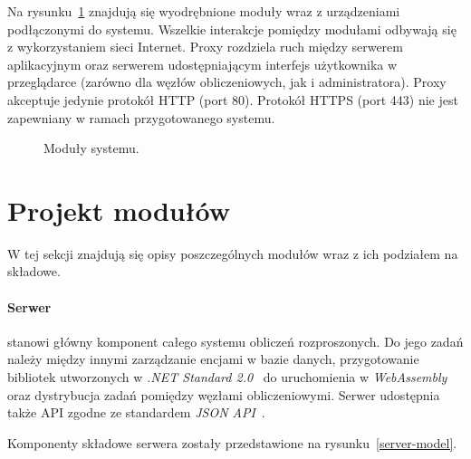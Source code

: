 \documentclass[a4paper,11pt,twoside]{report}
\theoremstyle{definition}
\begin{document}
Na rysunku~\ref{project-model} znajdują się wyodrębnione moduły wraz z urządzeniami podłączonymi do systemu. Wszelkie interakcje pomiędzy modułami odbywają się z wykorzystaniem sieci Internet. Proxy rozdziela ruch między serwerem aplikacyjnym oraz serwerem udostępniającym interfejs użytkownika w przeglądarce (zarówno dla węzłów obliczeniowych, jak i administratora). Proxy akceptuje jedynie protokół HTTP (port 80). Protokół HTTPS (port 443) nie jest zapewniany w ramach przygotowanego systemu.


\begin{figure} 
    \caption{Moduły systemu.}
    \label{project-model}
\end{figure}

\section{Projekt modułów}
\label{projekt-modulow}

W tej sekcji znajdują się opisy poszczególnych modułów wraz z ich podziałem na składowe.

\paragraph{Serwer}

stanowi główny komponent całego systemu obliczeń rozproszonych. Do jego zadań należy między innymi zarządzanie encjami w bazie danych, przygotowanie bibliotek utworzonych w \textit{.NET Standard 2.0}~\cite{dotnet-standard} do uruchomienia w \textit{WebAssembly}~\cite{webassembly} oraz dystrybucja zadań pomiędzy węzłami obliczeniowymi. Serwer udostępnia także API zgodne ze standardem \textit{JSON API}~\cite{jsonapi}.

Komponenty składowe serwera zostały przedstawione na rysunku~\ref{server-model}.
\end{document}
